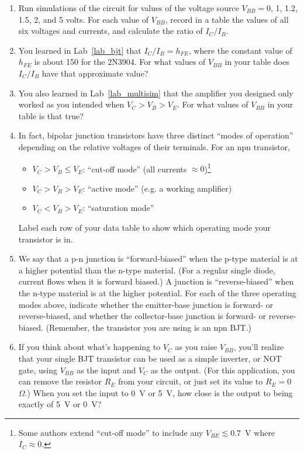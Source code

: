 \begin{enumerate}[wide]
\item Run simulations of the circuit for values of the voltage source $V_{BB} = 0$, 1, 1.2, 1.5, 2, and 5 volts.  For each value of $V_{BB}$, record in a table the values of all six voltages and currents, and calculate the ratio of  $I_C/I_B$.

\item You learned in Lab~\ref{lab_bjt} that $I_C / I_B = h_{FE}$, where the constant value of $h_{FE}$ is about 150 for the 2N3904.  For what values of $V_{BB}$ in your table does $I_C/I_B$ have that approximate value?

\item You also learned in  Lab~\ref{lab_multisim} that the amplifier you designed only worked as you intended when $V_C > V_B > V_E$.  For what values of $V_{BB}$ in your table is that true?

\item In fact, bipolar junction transistors have three distinct ``modes of operation'' depending on the relative voltages of their terminals.  For an npn transistor,
\begin{itemize}[nosep]
\item $V_C > V_B \leq V_E$: ``cut-off mode'' (all currents $\approx 0$)\footnote{Some authors extend ``cut-off mode'' to include any $V_{BE} \lesssim 0.7$~V where $I_C \approx 0$.}
\item $V_C > V_B > V_E$: ``active mode''  (e.g. a working amplifier)
\item$V_C < V_B > V_E$: ``saturation mode''
\end{itemize}
Label each row of your data table to show which operating mode your transistor is in.

\item We say that a p-n junction is ``forward-biased'' when the p-type material is at a higher potential than the n-type material.  (For a regular single diode, current flows when it is forward biased.)  A junction is ``reverse-biased'' when the n-type material is at the higher potential.  For each of the three operating modes above, indicate whether the emitter-base junction is forward- or reverse-biased, and whether the collector-base junction is forward- or reverse-biased.  (Remember, the transistor you are using is an npn BJT.)

\item If you think about what's happening to $V_C$ as you raise $V_{BB}$, you'll realize that your single BJT transistor can be used as a simple inverter, or NOT gate, using $V_{BB}$ as the input and $V_C$ as the output.  (For this application, you can remove the resistor $R_E$ from your circuit, or just set its value to $R_E = 0$~$\Omega$.)  When you set the input to 0~V or 5~V, how close is the output to being exactly of 5~V or 0~V?  


\end{enumerate}
